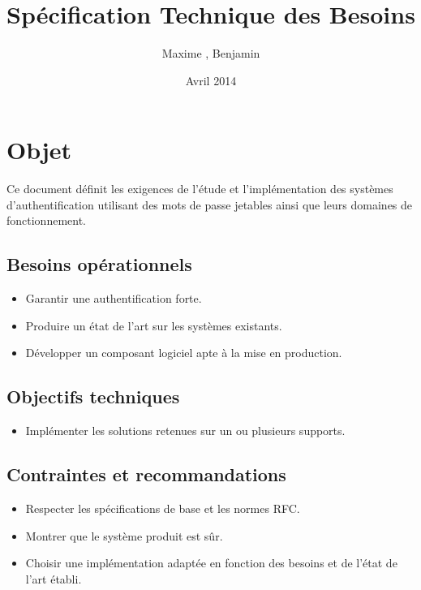 \documentclass{"../../res/univ-projet"}
\title{Spécification Technique des Besoins}
\author{Maxime \bsc{Michotte}, Benjamin \bsc{Zigh}}
\date{Avril 2014}
\begin{document}
\maketitle
\section{Objet}
Ce document définit les exigences de l'étude et l'implémentation des systèmes d'authentification 
utilisant des mots de passe jetables ainsi que leurs domaines de fonctionnement.

    \subsection{Besoins opérationnels} 
        \begin{itemize}
            \item Garantir une authentification forte.
            \item Produire un état de l'art sur les systèmes existants.
            \item Développer un composant logiciel apte à la mise en production.
        \end{itemize}
    \subsection{Objectifs techniques}
    \begin{itemize}	
            \item Implémenter les solutions retenues sur un ou plusieurs supports.
    \end{itemize}
    \subsection{Contraintes et recommandations} 
        \begin{itemize}
            \item Respecter les spécifications de base et les normes RFC.
            \item Montrer que le système produit est sûr.
            \item Choisir une implémentation adaptée en fonction des besoins et de l'état de l'art établi.
        \end{itemize}
\end{document}
